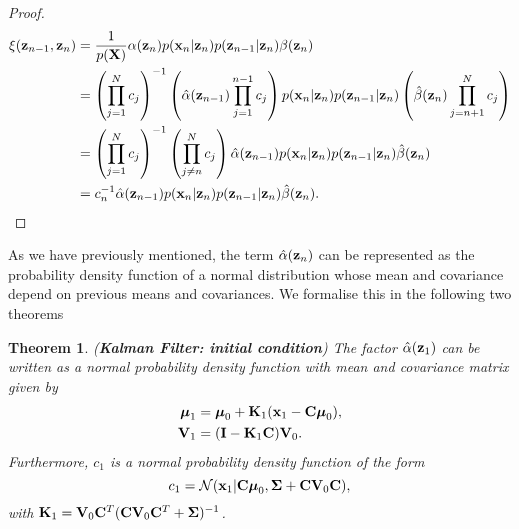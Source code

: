 \documentclass[11pt]{article}
\numberwithin{equation}{section}
\newcommand{\x}{{\bf x}}
\newcommand{\z}{{\bf z}}
\newcommand{\N}{\mathcal{N}}
\newtheorem{theorem}{Theorem}[section]
\begin{document}
\begin{proof}
	\begin{align}
		\xi(\z_{n-1}, \z_n) &= \frac{1}{p({\bf X})} \alpha(\z_n) p(\x_n \vert \z_n) p(\z_{n-1} \vert \z_n) \beta(\z_n) \\
		&= \left(\prod_{j=1}^N c_j\right)^{-1} \left(\hat\alpha(\z_{n-1}) \prod_{j=1}^{n-1} c_j\right)p(\x_n \vert \z_n) p(\z_{n-1} \vert \z_n)\left(\hat\beta(\z_n) \prod_{j={n+1}}^N c_j\right) \\
		&= \left(\prod_{j=1}^N c_j\right)^{-1} \left(\prod_{j\neq n}^N c_j\right) \hat\alpha(\z_{n-1}) p(\x_n \vert \z_n) p(\z_{n-1} \vert \z_n) \hat\beta(\z_n)\\
		&= c_n^{-1}\hat\alpha(\z_{n-1}) p(\x_n \vert \z_n) p(\z_{n-1} \vert \z_n) \hat\beta(\z_n).
	\end{align}
\end{proof}

As we have previously mentioned, the term $\hat\alpha(\z_n)$ can be represented as the probability density function of a normal distribution whose mean and covariance depend on previous means and covariances. We formalise this in the following two theorems

\begin{theorem} (\textbf{Kalman Filter: initial condition}) \label{theorem:kalman-filter}
	The factor $\hat\alpha(\z_1)$ can be written as a normal probability density function with mean and covariance matrix given by
	\begin{align}
		\boldsymbol{\mu}_1 &= \boldsymbol{\mu}_0 + {\bf K}_1(\x_1 -{\bf C}\boldsymbol\mu_0),\\
		{\bf V}_1 &=  ({\bf I} - {\bf K}_1{\bf C}){\bf V}_0.
	\end{align}
	Furthermore, $c_1$ is a normal probability density function of the form
	\begin{equation}
		c_1 = \N(\x_1\vert {\bf C}\boldsymbol\mu_0, \boldsymbol\Sigma + {\bf C} {\bf V}_0 {\bf C}),
	\end{equation}
	with ${\bf K}_1 = {\bf V}_0{\bf C}^T({\bf C} {\bf V}_0 {\bf C}^T + \boldsymbol\Sigma)^{-1}$.
\end{theorem}
\end{document}
